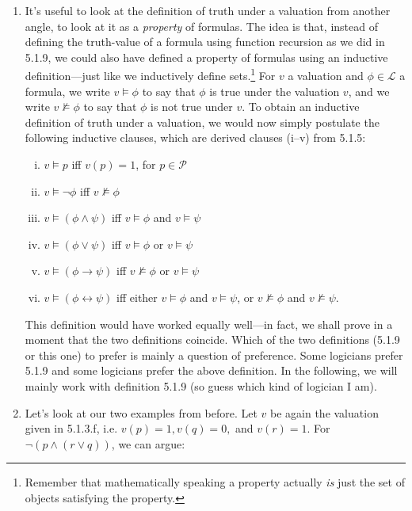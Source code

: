 \begin{enumerate}[\thesection.1]
		\item It's useful to look at the definition of truth under a valuation from another angle, to look at it as a \emph{property} of formulas. The idea is that, instead of defining the truth-value of a formula using function recursion as we did in 5.1.9, we could also have defined a property of formulas using an inductive definition---just like we inductively define sets.\footnote{Remember that mathematically speaking a property actually \emph{is} just the set of objects satisfying the property.} For $v$ a valuation and $\phi\in\mathcal{L}$ a formula, we write $v\vDash \phi$ to say that $\phi$ is true under the valuation $v$, and we write $v\nvDash\phi$ to say that $\phi$ is not true under $v$. To obtain an inductive definition of truth under a valuation, we would now simply postulate the following inductive clauses, which are derived clauses (i--v) from 5.1.5:
		\begin{enumerate}[(i)]
		
					\item $v\vDash p$ iff $v(p)=1$, for $p\in\mathcal{P}$
				
					\item $v\vDash \neg\phi$ iff $v\nvDash\phi$
					
					\item $v\vDash(\phi\land\psi)$ iff $v\vDash\phi$ and $v\vDash\psi$
					\item $v\vDash(\phi\lor\psi)$ iff $v\vDash\phi$ or $v\vDash\psi$
					\item $v\vDash(\phi\to\psi)$ iff $v\nvDash\phi$ or $v\vDash\psi$
					\item $v\vDash(\phi\leftrightarrow\psi)$ iff   either $v\vDash\phi$ and $v\vDash\psi$, or $v\nvDash\phi$ and $v\nvDash\psi$.
				
				\end{enumerate}
This definition would have worked equally well---in fact, we shall prove in a moment that the two definitions coincide. Which of the two definitions (5.1.9 or this one) to prefer is mainly a question of preference. Some logicians prefer 5.1.9 and some logicians prefer the above definition. In the following, we will mainly work with definition 5.1.9 (so guess which kind of logician I am). 
		
	\item Let's look at our two examples from before. Let $v$ be again the valuation given in 5.1.3.f, i.e. $v(p)=1,v(q)=0,$ and $v(r)=1$. For $\neg (p\land (r\lor q))$, we can argue:
		\begin{itemize}
		

\end{itemize}
\end{enumerate}
